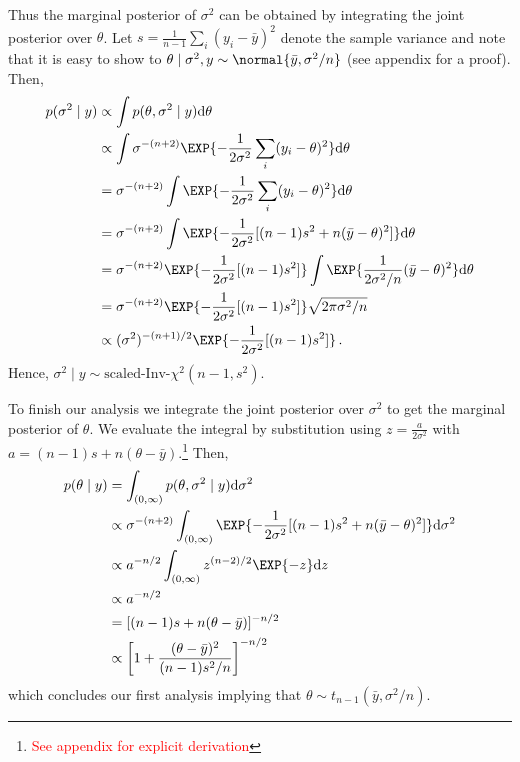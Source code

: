 Thus the marginal posterior of $\sigma^2$ can be obtained by integrating the joint posterior
over $\theta$. Let $s = \frac{1}{n-1} \sum_i (y_i - \bar{y})^2$ denote the sample
variance and note that it is easy to show to
$\theta \mid \sigma^2, y \sim \normal{\bar{y}, \sigma^2/n}$ (see appendix for a proof).
Then,
\begin{align}
  p(\sigma^2 \mid y) &\propto \int p(\theta, \sigma^2 \mid y) \mathrm{d} \theta\\
  &\propto \int \sigma^{-(n+2)} \EXP{-\frac{1}{2\sigma^2}\sum_i (y_i - \theta)^2} \mathrm{d} \theta\\
  &= \sigma^{-(n+2)} \int \EXP{-\frac{1}{2\sigma^2}\sum_i (y_i - \theta)^2} \mathrm{d} \theta\\
  &= \sigma^{-(n+2)} \int \EXP{-\frac{1}{2\sigma^2}[(n-1) s^2 + n(\bar{y} - \theta)^2]} \mathrm{d} \theta\\
  &= \sigma^{-(n+2)} \EXP{-\frac{1}{2\sigma^2}[(n-1) s^2]} \int \EXP{\frac{1}{2\sigma^2/n}(\bar{y} - \theta)^2} \mathrm{d} \theta\\
  &= \sigma^{-(n+2)} \EXP{-\frac{1}{2\sigma^2}[(n-1) s^2]} \sqrt{2 \pi \sigma^2 / n} \\
  &\propto (\sigma^2)^{-(n+1)/2} \EXP{-\frac{1}{2\sigma^2}[(n-1) s^2]} \,.
\end{align}
Hence, $\sigma^2 \mid y \sim \text{scaled-Inv-} \chi^2(n-1, s^2)$.

To finish our analysis we integrate the joint posterior over $\sigma^2$ to get
the marginal posterior of $\theta$. We evaluate the integral by substitution using
$z = \frac{a}{2 \sigma^2}$ with $a = (n-1)s + n(\theta - \bar{y})$.\footnote{\textcolor{red}{See appendix for explicit derivation}}
Then,
\begin{align}
  p(\theta \mid y) &= \int_{(0, \infty)} p(\theta, \sigma^2 \mid y) \mathrm{d}\sigma^2\\
  &\propto \sigma^{-(n+2)} \int_{(0, \infty)} \EXP{-\frac{1}{2\sigma^2}[(n-1) s^2 + n(\bar{y} - \theta)^2]} \mathrm{d} \sigma^2\\
  &\propto a^{-n/2} \int_{(0, \infty)} z^{(n-2)/2}\EXP{-z} \mathrm{d}z\\
  &\propto a^{-n/2}\\
  &= [(n-1)s + n(\theta - \bar{y})]^{-n/2}\\
  &\propto \left[1 + \frac{(\theta - \bar{y})^2}{(n-1) s^2 / n}\right]^{-n/2} \,
\end{align}
which concludes our first analysis implying that $\theta \sim t_{n-1}(\bar{y}, \sigma^2/n)$.

